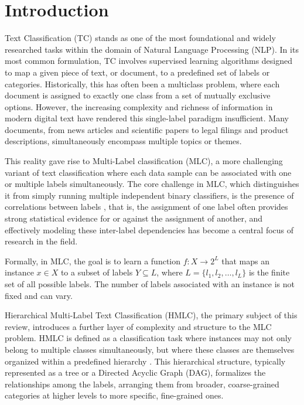 \section{Introduction}

Text Classification (TC) stands as one of the most foundational and widely researched tasks within the domain of Natural Language Processing (NLP). \cite{Zangari2024}  In its most common formulation, TC involves supervised learning algorithms designed to map a given piece of text, or document, to a predefined set of labels or categories. \cite{Zangari2024} Historically, this has often been a multiclass problem, where each document is assigned to exactly one class from a set of mutually exclusive options. However, the increasing complexity and richness of information in modern digital text have rendered this single-label paradigm insufficient.\cite{Hu2025}  Many documents, from news articles and scientific papers to legal filings and product descriptions, simultaneously encompass multiple topics or themes. \cite{TidakeSane2018}

This reality gave rise to Multi-Label classification (MLC), a more challenging variant of text classification where each data sample can be associated with one or multiple labels simultaneously.\cite{TidakeSane2018} The core challenge in MLC, which distinguishes it from simply running multiple independent binary classifiers, is the presence of correlations between labels \cite{TidakeSane2018}, that is, the assignment of one label often provides strong statistical evidence for or against the assignment of another, and effectively modeling these inter-label dependencies has become a central focus of research in the field. \cite{Huang2024, TidakeSane2018}

Formally, in MLC, the goal is to learn a function $f: X \rightarrow 2^L$ that maps an instance $x \in X$ to a subset of labels $Y \subseteq L$, where $L = \{l_1, l_2, \ldots, l_L\}$ is the finite set of all possible labels. The number of labels associated with an instance is not fixed and can vary. \cite{TidakeSane2018}

Hierarchical Multi-Label Text Classification (HMLC), the primary subject of this review, introduces a further layer of complexity and structure to the MLC problem. HMLC is defined as a classification task where instances may not only belong to multiple classes simultaneously, but where these classes are themselves organized within a predefined hierarchy \cite{liu2023recentadvanceshierarchicalmultilabel}. This hierarchical structure, typically represented as a tree or a Directed Acyclic Graph (DAG), formalizes the relationships among the labels, arranging them from broader, coarse-grained categories at higher levels to more specific, fine-grained ones. \cite{liu2023recentadvanceshierarchicalmultilabel}

